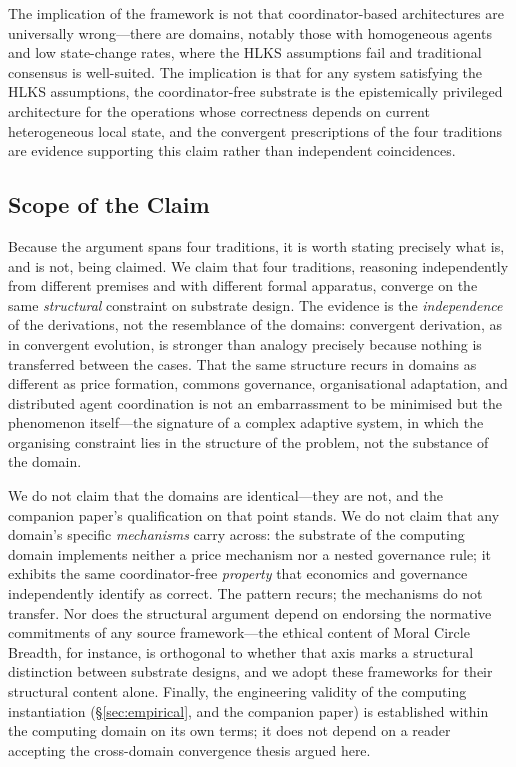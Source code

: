 \documentclass[11pt]{article}
\theoremstyle{definition}
\theoremstyle{plain}
\theoremstyle{plain}
\begin{document}
The implication of the framework is not that coordinator-based architectures
are universally wrong---there are domains, notably those with homogeneous
agents and low state-change rates, where the HLKS assumptions fail and
traditional consensus is well-suited. The implication is that for any system
satisfying the HLKS assumptions, the coordinator-free substrate is the
epistemically privileged architecture for the operations whose correctness depends
on current heterogeneous local state, and the convergent prescriptions of the four
traditions are evidence supporting this claim rather than independent coincidences.

\subsection{Scope of the Claim}
\label{sec:scope}

Because the argument spans four traditions, it is worth stating precisely what is,
and is not, being claimed. We claim that four traditions, reasoning independently
from different premises and with different formal apparatus, converge on the same
\emph{structural} constraint on substrate design. The evidence is the
\emph{independence} of the derivations, not the resemblance of the domains:
convergent derivation, as in convergent evolution, is stronger than analogy
precisely because nothing is transferred between the cases. That the same
structure recurs in domains as different as price formation, commons governance,
organisational adaptation, and distributed agent coordination is not an
embarrassment to be minimised but the phenomenon itself---the signature of a
complex adaptive system, in which the organising constraint lies in the structure
of the problem, not the substance of the domain.

We do not claim that the domains are identical---they are not, and the companion
paper's qualification on that point stands. We do not claim that any domain's
specific \emph{mechanisms} carry across: the substrate of the computing domain
implements neither a price mechanism nor a nested governance rule; it exhibits the
same coordinator-free \emph{property} that economics and governance independently
identify as correct. The pattern recurs; the mechanisms do not transfer. Nor does
the structural argument depend on endorsing the normative commitments of any source
framework---the ethical content of Moral Circle Breadth, for instance, is
orthogonal to whether that axis marks a structural distinction between substrate
designs, and we adopt these frameworks for their structural content alone. Finally,
the engineering validity of the computing instantiation (\S\ref{sec:empirical}, and
the companion paper) is established within the computing domain on its own terms; it
does not depend on a reader accepting the cross-domain convergence thesis argued
here.
\end{document}
